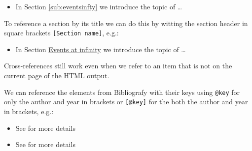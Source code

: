 \documentclass[
]{book}
\providecommand{\tightlist}{%
  \setlength{\itemsep}{0pt}\setlength{\parskip}{0pt}}
\theoremstyle{definition}
\theoremstyle{definition}
\theoremstyle{definition}
\theoremstyle{definition}
\theoremstyle{remark}
\begin{document}
\begin{itemize}
\tightlist
\item
  In Section \ref{sub:eventsinfty} we introduce the topic of \ldots{}
\end{itemize}

To reference a section by its title we can do this by witting the section
header in square brackets \texttt{{[}Section\ name{]}}, e.g.:

\begin{itemize}
\tightlist
\item
  In Section \protect\hyperlink{sub:eventsinfty}{Events at infinity} we introduce the topic of \ldots{}
\end{itemize}

Cross-references still work even when we refer to an item that is not on the
current page of the HTML output.

We can reference the elements from Bibliografy with their keys using \texttt{@key} for
only the author and year in brackets or \texttt{{[}@key{]}} for the both the author and
year in brackets, e.g.:

\begin{itemize}
\tightlist
\item
  See \citet{Cohn13} for more details
\item
  See \citep{Cohn13} for more details
\end{itemize}

\backmatter

  
\end{document}
